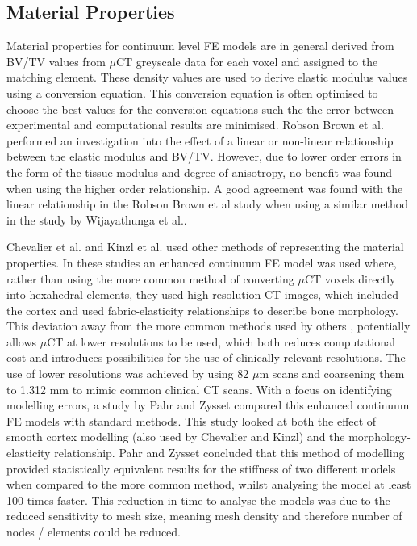 \subsection{Material Properties}\label{material-properties}

Material properties for continuum level FE models are in general derived
from BV/TV values from $\mu$CT greyscale data for each voxel and assigned to
the matching element. These density values are used to derive elastic
modulus values using a conversion equation. This conversion equation is often optimised to choose the best values for the conversion equations such the the error between experimental and computational results are minimised. Robson Brown et al.
\cite{RobsonBrown2014}
performed an investigation into the effect of a linear or non-linear
relationship between the elastic modulus and BV/TV. However, due to
lower order errors in the form of the tissue modulus and degree of anisotropy, no benefit
was found when using the higher order relationship. A good
agreement was found with the linear relationship in the Robson Brown
et al study when using a similar method in the study by Wijayathunga et
al.\cite{Wijayathunga2008}.

Chevalier et al. \cite{Chevalier2009} and Kinzl et al. \cite{Kinzl2012} used
other
methods
of representing the material properties. In these studies an enhanced
continuum FE model was used where, rather than using the more common
method of converting $\mu$CT voxels directly into hexahedral elements, they
used high-resolution CT images, which included the cortex and used
fabric-elasticity relationships to describe bone morphology. This
deviation away from the more common methods used by others
\cite{RobsonBrown2014, Wijayathunga2008}, potentially allows $\mu$CT at lower resolutions to be
used, which
both reduces computational cost and introduces possibilities for the use
of clinically relevant resolutions. The use of lower resolutions was achieved by using 82 $\mu$m scans and coarsening them to 1.312 mm to mimic common clinical CT
scans. With a focus on identifying modelling errors, a study by Pahr and
Zysset \cite{Pahr2009} compared this enhanced continuum FE models with
standard methods. This study looked at both the effect of smooth cortex
modelling (also used by Chevalier and Kinzl) and the
morphology-elasticity relationship. Pahr and Zysset concluded that this
method of modelling provided statistically equivalent results for the
stiffness of two different models when compared to the more common
method, whilst analysing the model at least 100 times faster.
This reduction in time to analyse the models was due to the reduced sensitivity to mesh size, meaning
mesh density and therefore number of nodes / elements could be reduced.

